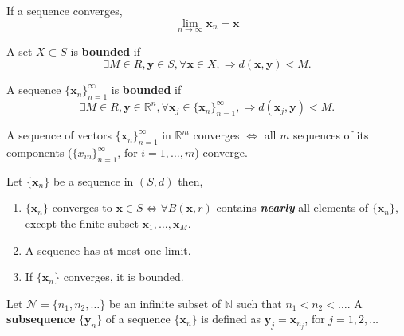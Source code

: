\begin{definition} If a sequence converges,
    \begin{equation*}
        \lim_{n \to \infty} \mathbf{x}_n = \mathbf{x}
    \end{equation*}
\end{definition}

\begin{definition}
    A set $X \subset S$ is \textbf{bounded} if \begin{equation*}
        \exists M \in R, \mathbf{y} \in S, \forall \mathbf{x} \in X, \Rightarrow d(\mathbf{x},\mathbf{y}) < M.
    \end{equation*}
\end{definition}

\begin{definition}
    A sequence $\{{\mathbf{x}_n}\}_{n=1}^{\infty}$ is \textbf{bounded} if \begin{equation*}
        \exists M \in R, \mathbf{y} \in \mathbb{R}^{n}, \forall \mathbf{x}_j \in \{{\mathbf{x}_n}\}_{n=1}^{\infty}, \Rightarrow d(\mathbf{x}_j,\mathbf{y}) < M.
    \end{equation*}
\end{definition}

\begin{proposition}
    A sequence of vectors $\{{\mathbf{x}_n}\}_{n=1}^{\infty}$ in $\mathbb{R}^{m}$ converges $\iff$ all $m$ sequences of its components ($\{x_{in}\}_{n=1}^{\infty }$, for $i=1,\dots,m$) converge.
\end{proposition}


\begin{proposition} Let $\{\mathbf{x}_n\}$ be a sequence in $(S,d)$ then,
    \begin{enumerate}
        \item $\{\mathbf{x}_{n}\}$ converges to $\mathbf{x} \in S \iff \forall B(\mathbf{x},r)$ contains \textit{\textbf{nearly}} all elements of  $\{\mathbf{x}_{n}\}$, except the finite subset $\mathbf{x}_1,\dots,\mathbf{x}_M$.
        \item A sequence has at most one limit.
        \item If $\{\mathbf{x}_{n}\}$ converges, it is bounded.
    \end{enumerate}
\end{proposition}

\begin{definition}[Subsequence]
    Let $\mathcal{N} = \{n_1, n_2, \dots\}$ be an infinite subset of $\mathbb{N}$ such that $n_1 < n_2 < \dots$. A \textbf{subsequence} $\{\mathbf{y}_n\}$ of a sequence $\{\mathbf{x}_n\}$ is defined as $\mathbf{y}_j = \mathbf{x}_{n_j}$, for $j=1,2,\dots$
\end{definition}

